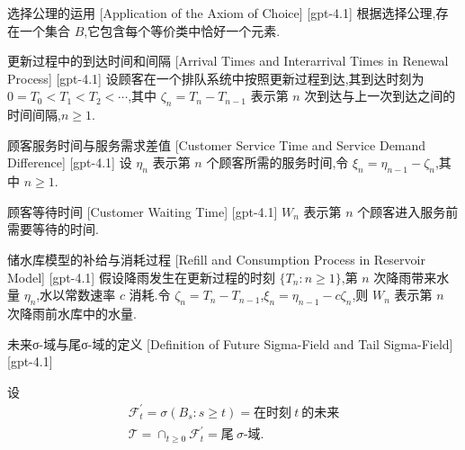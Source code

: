 \documentclass[UTF8]{ctexart}
\begin{document}
    \begin{axm}
        {选择公理的运用}
        [Application of the Axiom of Choice]
        [gpt-4.1]
        根据选择公理,存在一个集合 $B$,它包含每个等价类中恰好一个元素.
    \end{axm}
    
    
    
    \begin{dfn}
        {更新过程中的到达时间和间隔}
        [Arrival Times and Interarrival Times in Renewal Process]
        [gpt-4.1]
        设顾客在一个排队系统中按照更新过程到达,其到达时刻为 $0 = T_0 < T_1 < T_2 < \cdots$,其中 $\zeta_n = T_n - T_{n-1}$ 表示第 $n$ 次到达与上一次到达之间的时间间隔,$n \geq 1$.
    \end{dfn}
    
    
    
    \begin{dfn}
        {顾客服务时间与服务需求差值}
        [Customer Service Time and Service Demand Difference]
        [gpt-4.1]
        设 $\eta_n$ 表示第 $n$ 个顾客所需的服务时间,令 $\xi_n = \eta_{n-1} - \zeta_n$,其中 $n \geq 1$.
    \end{dfn}
    
    
    
    \begin{dfn}
        {顾客等待时间}
        [Customer Waiting Time]
        [gpt-4.1]
        $W_n$ 表示第 $n$ 个顾客进入服务前需要等待的时间.
    \end{dfn}
    
    
    
    \begin{dfn}
        {储水库模型的补给与消耗过程}
        [Refill and Consumption Process in Reservoir Model]
        [gpt-4.1]
        假设降雨发生在更新过程的时刻 $\{T_n : n \geq 1\}$,第 $n$ 次降雨带来水量 $\eta_n$,水以常数速率 $c$ 消耗.令 $\zeta_n = T_n - T_{n-1}$,$\xi_n = \eta_{n-1} - c\zeta_n$,则 $W_n$ 表示第 $n$ 次降雨前水库中的水量.
    \end{dfn}
    
    
    
    \begin{dfn}
        {未来σ-域与尾σ-域的定义}
        [Definition of Future Sigma-Field and Tail Sigma-Field]
        [gpt-4.1]
        
设
\[
\begin{array}{r}
\mathcal{F}_{t}^{\prime} = \sigma( B_{s} : s \geq t ) = \text{在时刻} \ t \ \text{的未来} \\
\mathcal{T} = \cap_{t \geq 0} \mathcal{F}_{t}^{\prime} = \text{尾} \ \sigma\text{-域.}
\end{array}
\]

    \end{dfn}
    
\end{document}

